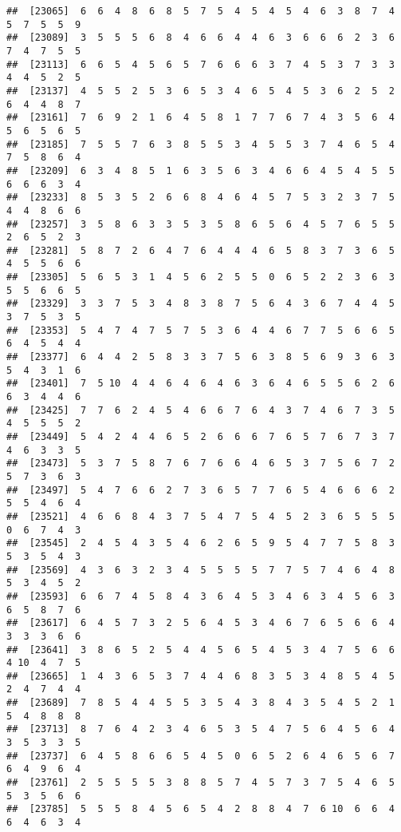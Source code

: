 \documentclass[
]{book}
\begin{document}
\begin{verbatim}
##  [23065]  6  6  4  8  6  8  5  7  5  4  5  4  5  4  6  3  8  7  4  5  7  5  5  9
##  [23089]  3  5  5  5  6  8  4  6  6  4  4  6  3  6  6  6  2  3  6  7  4  7  5  5
##  [23113]  6  6  5  4  5  6  5  7  6  6  6  3  7  4  5  3  7  3  3  4  4  5  2  5
##  [23137]  4  5  5  2  5  3  6  5  3  4  6  5  4  5  3  6  2  5  2  6  4  4  8  7
##  [23161]  7  6  9  2  1  6  4  5  8  1  7  7  6  7  4  3  5  6  4  5  6  5  6  5
##  [23185]  7  5  5  7  6  3  8  5  5  3  4  5  5  3  7  4  6  5  4  7  5  8  6  4
##  [23209]  6  3  4  8  5  1  6  3  5  6  3  4  6  6  4  5  4  5  5  6  6  6  3  4
##  [23233]  8  5  3  5  2  6  6  8  4  6  4  5  7  5  3  2  3  7  5  4  4  8  6  6
##  [23257]  3  5  8  6  3  3  5  3  5  8  6  5  6  4  5  7  6  5  5  2  6  5  2  3
##  [23281]  5  8  7  2  6  4  7  6  4  4  4  6  5  8  3  7  3  6  5  4  5  5  6  6
##  [23305]  5  6  5  3  1  4  5  6  2  5  5  0  6  5  2  2  3  6  3  5  5  6  6  5
##  [23329]  3  3  7  5  3  4  8  3  8  7  5  6  4  3  6  7  4  4  5  3  7  5  3  5
##  [23353]  5  4  7  4  7  5  7  5  3  6  4  4  6  7  7  5  6  6  5  6  4  5  4  4
##  [23377]  6  4  4  2  5  8  3  3  7  5  6  3  8  5  6  9  3  6  3  5  4  3  1  6
##  [23401]  7  5 10  4  4  6  4  6  4  6  3  6  4  6  5  5  6  2  6  6  3  4  4  6
##  [23425]  7  7  6  2  4  5  4  6  6  7  6  4  3  7  4  6  7  3  5  4  5  5  5  2
##  [23449]  5  4  2  4  4  6  5  2  6  6  6  7  6  5  7  6  7  3  7  4  6  3  3  5
##  [23473]  5  3  7  5  8  7  6  7  6  6  4  6  5  3  7  5  6  7  2  5  7  3  6  3
##  [23497]  5  4  7  6  6  2  7  3  6  5  7  7  6  5  4  6  6  6  2  5  5  4  6  4
##  [23521]  4  6  6  8  4  3  7  5  4  7  5  4  5  2  3  6  5  5  5  0  6  7  4  3
##  [23545]  2  4  5  4  3  5  4  6  2  6  5  9  5  4  7  7  5  8  3  5  3  5  4  3
##  [23569]  4  3  6  3  2  3  4  5  5  5  5  7  7  5  7  4  6  4  8  5  3  4  5  2
##  [23593]  6  6  7  4  5  8  4  3  6  4  5  3  4  6  3  4  5  6  3  6  5  8  7  6
##  [23617]  6  4  5  7  3  2  5  6  4  5  3  4  6  7  6  5  6  6  4  3  3  3  6  6
##  [23641]  3  8  6  5  2  5  4  4  5  6  5  4  5  3  4  7  5  6  6  4 10  4  7  5
##  [23665]  1  4  3  6  5  3  7  4  4  6  8  3  5  3  4  8  5  4  5  2  4  7  4  4
##  [23689]  7  8  5  4  4  5  5  3  5  4  3  8  4  3  5  4  5  2  1  5  4  8  8  8
##  [23713]  8  7  6  4  2  3  4  6  5  3  5  4  7  5  6  4  5  6  4  3  5  3  3  5
##  [23737]  6  4  5  8  6  6  5  4  5  0  6  5  2  6  4  6  5  6  7  6  4  9  6  4
##  [23761]  2  5  5  5  5  3  8  8  5  7  4  5  7  3  7  5  4  6  5  5  3  5  6  6
##  [23785]  5  5  5  8  4  5  6  5  4  2  8  8  4  7  6 10  6  6  4  6  4  6  3  4

\end{verbatim}
\end{document}
